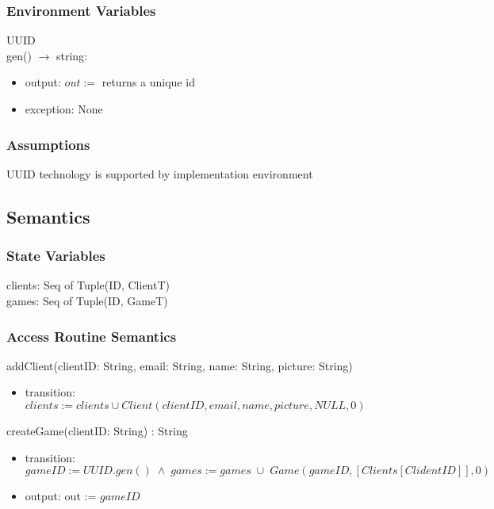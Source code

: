 \documentclass[12pt, titlepage]{article}
\begin{document}
\subsubsection{Environment Variables}

UUID\\
gen() $\rightarrow$ string:
\begin{itemize}
    \item output: $out := $ returns a unique id
    \item exception:    None
\end{itemize}

\subsubsection{Assumptions}

UUID technology is supported by implementation environment


\subsection{Semantics}

\subsubsection{State Variables}

clients: Seq of Tuple(ID, ClientT) \\
games: Seq of Tuple(ID, GameT)


\subsubsection{Access Routine Semantics}

\noindent addClient(clientID: String, email: String, name: String, picture: String)
\begin{itemize}
\item transition:$clients := clients \cup Client(clientID, email, name, picture, NULL, 0)$ \\
\end{itemize}


\noindent createGame(clientID: String) : String
\begin{itemize}
\item transition: \\$gameID := UUID.gen() \;\land\; games := games \; \cup \; Game(gameID, [Clients[ClidentID]], 0)$
\item output: out := $gameID$ \\
\end{itemize}
\end{document}
